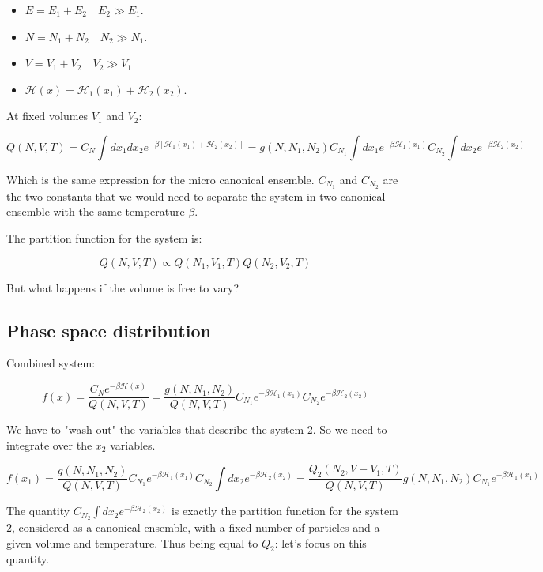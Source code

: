 \begin{multicols}{2}
	\begin{itemize}
		\item $E = E_1 + E_2\quad E_2\gg E_1$.
		\item $N = N_1 + N_2\quad N_2\gg N_1$.
		\item $V = V_1 + V_2\quad V_2\gg V_1$
		\item $\mathcal{H}(x) = \mathcal{H}_1(x_1) + \mathcal{H}_2(x_2)$.
	\end{itemize}
\end{multicols}


At fixed volumes $V_1$ and $V_2$:

$$Q(N, V, T) = C_N\int dx_1dx_2 e^{-\beta[\mathcal{H}_1(x_1) + \mathcal{H}_2(x_2)]} = g(N, N_1, N_2)C_{N_1}\int dx_1 e^{-\beta\mathcal{H}_1(x_1)}C_{N_2}\int dx_2 e^{-\beta\mathcal{H}_2(x_2)}$$

Which is the same expression for the micro canonical ensemble. $C_{N_1}$ and $C_{N_2}$ are the two constants that we would need to separate the system in two canonical ensemble with the same temperature $\beta$.

The partition function for the system is:

$$Q(N, V, T) \propto Q(N_1, V_1, T)Q(N_2, V_2, T)$$

But what happens if the volume is free to vary?

	\subsection{Phase space distribution}
	Combined system:

	$$f(x) = \frac{C_Ne^{-\beta\mathcal{H}(x)}}{Q(N, V, T)} = \frac{g(N, N_1, N_2)}{Q(N, V, T)}C_{N_1}e^{-\beta\mathcal{H}_1(x_1)}C_{N_2}e^{-\beta\mathcal{H}_2(x_2)}$$

We have to "wash out" the variables that describe the system $2$. So we need to integrate over the $x_2$ variables.

	$$f(x_1) = \frac{g(N, N_1, N_2)}{Q(N, V, T)}C_{N_1}e^{-\beta\mathcal{H}_1(x_1)}C_{N_2}\int dx_2 e^{-\beta\mathcal{H}_2(x_2)} = \frac{Q_2(N_2, V-V_1, T)}{Q(N, V, T)}g(N, N_1, N_2)C_{N_1}e^{-\beta\mathcal{H}_1(x_1)}$$

	The quantity $C_{N_2}\int dx_2 e^{-\beta\mathcal{H}_2(x_2)}$ is exactly the partition function for the system $2$, considered as a canonical ensemble, with a fixed number of particles and a given volume and temperature. Thus being equal to $Q_2$: let's focus on this quantity.

